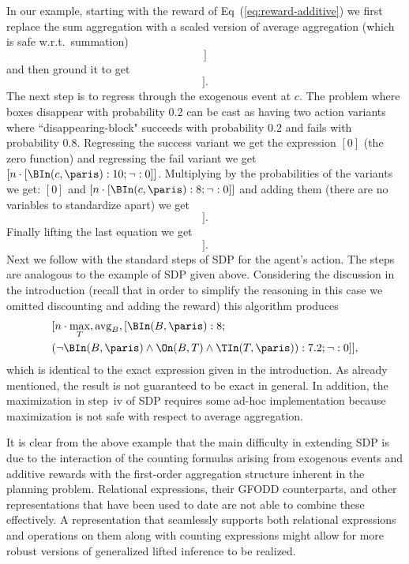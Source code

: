 In our example, starting with the reward of Eq~(\ref{eq:reward-additive}) we first replace the sum aggregation with a scaled version of average aggregation (which is safe w.r.t.\ summation)
\begin{equation*}
[n \cdot \mbox{avg}_B [\BIn(B,\paris): 10; \neg: 0]]
\end{equation*}
and then ground it to get
\begin{equation*}
[n \cdot [\BIn(c,\paris): 10; \neg: 0]].
\end{equation*}
The next step is to regress through the exogenous event at $c$. The problem where boxes disappear with probability 0.2 can be cast as having two action variants where ``disappearing-block" succeeds with probability 0.2 and fails with probability 0.8.
Regressing the success variant we get the expression $[0]$ (the zero function) and regressing the fail variant we get
$[n \cdot [\BIn(c,\paris): 10; \neg: 0]]$. Multiplying by the probabilities of the variants we get:
$[0]$ and  $[n \cdot [\BIn(c,\paris): 8; \neg: 0]]$ and adding them (there are no variables to standardize apart) we get
\begin{equation*}
[n \cdot  [\BIn(c,\paris): 8; \neg: 0]].
\end{equation*}
Finally lifting the last equation we get
\begin{equation*}
[n \cdot \mbox{avg}_B [\BIn(B,\paris): 8; \neg  \BIn(B,\paris): 0]].
\end{equation*}
Next we follow with the standard steps of SDP for the agent's action. The steps are analogous to the example of SDP given above. 
%
%
%
Considering the discussion in the 
introduction (recall that in order to simplify the reasoning in this case we omitted discounting and adding the reward) this algorithm produces 
  \begin{align*}
%
& [n \cdot  \max_T, \mbox{avg}_B, 
[\BIn(B,\paris):8;  \\
& (\neg \BIn(B,\paris) \land \On(B,T) \land \TIn(T,\paris)): 7.2; \neg: 0]] , 
  \end{align*}
which is identical to the exact expression given in the introduction.
%
As already mentioned, the result is not guaranteed to be exact in general. 
%
In addition, the maximization in step~iv of SDP requires some ad-hoc implementation because maximization is not safe with respect to average aggregation.

It is clear from the above example that the main difficulty in extending SDP is due to the
interaction of the counting formulas arising from exogenous events and
additive rewards with the first-order aggregation structure inherent
in the planning problem.  Relational expressions, their GFODD counterparts, and other representations that have been used to date are not able to combine these effectively. A representation that seamlessly supports both
relational expressions and operations on them along with counting expressions
might allow for more robust versions of generalized lifted inference to be realized.



%
%
%
%
%
%
%
%
%
%
%
%
%
%
%
%
%
%
%
%
%
%
%
%
%
%
%
%
%
%
%


%
%
%
%
%
%
%
%
%
%
%
%
%
%
%
%
%
%
%
%
%
